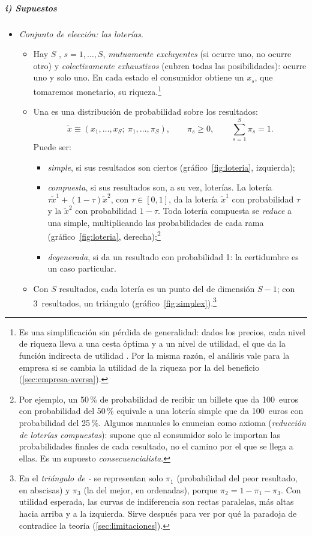 \documentclass[11pt]{article}
\begin{document}
\subparagraph{i) Supuestos}

\begin{itemize}
\item \emph{Conjunto de elección: las loterías}.
  \begin{itemize}
  \item Hay $S$ , $s=1,\dots,S$, \emph{mutuamente excluyentes} (si ocurre uno, no ocurre otro) y \emph{colectivamente exhaustivos} (cubren todas las posibilidades): ocurre uno y solo uno. En cada estado el consumidor obtiene un  $x_s$, que tomaremos monetario, su riqueza.\footnote{Es una simplificación sin pérdida de generalidad: dados los precios, cada nivel de riqueza lleva a una cesta óptima y a un nivel de utilidad, el que da la función indirecta de utilidad . Por la misma razón, el análisis vale para la empresa si se cambia la utilidad de la riqueza por la del beneficio (\ref{sec:empresa-aversa}).}
  \item Una  es una distribución de probabilidad sobre los resultados:
    $$\tilde{x}\equiv(x_1,\dots,x_S;\ \pi_1,\dots,\pi_S),\qquad \pi_s\geq 0,\qquad \sum_{s=1}^{S}\pi_s=1 .$$
    Puede ser:
    \begin{itemize}
    \item \emph{simple}, si sus resultados son ciertos (gráfico~\ref{fig:loteria}, izquierda);
    \item \emph{compuesta}, si sus resultados son, a su vez, loterías. La lotería $\tau\tilde{x}^1+(1-\tau)\tilde{x}^2$, con $\tau\in[0,1]$, da la lotería $\tilde{x}^1$ con probabilidad $\tau$ y la $\tilde{x}^2$ con probabilidad $1-\tau$. Toda lotería compuesta se \emph{reduce} a una simple, multiplicando las probabilidades de cada rama (gráfico~\ref{fig:loteria}, derecha);\footnote{Por ejemplo, un 50\,\% de probabilidad de recibir un billete que da 100~euros con probabilidad del 50\,\% equivale a una lotería simple que da 100~euros con probabilidad del 25\,\%. Algunos manuales lo enuncian como axioma (\emph{reducción de loterías compuestas}): supone que al consumidor solo le importan las probabilidades finales de cada resultado, no el camino por el que se llega a ellas. Es un supuesto \emph{consecuencialista}.}
    \item \emph{degenerada}, si da un resultado con probabilidad 1: la certidumbre es un caso particular.
    \end{itemize}
  \item Con $S$ resultados, cada lotería es un punto del  de dimensión $S-1$; con 3~resultados, un triángulo (gráfico~\ref{fig:simplex}).\footnote{En el \emph{triángulo de -} se representan solo $\pi_1$ (probabilidad del peor resultado, en abscisas) y $\pi_3$ (la del mejor, en ordenadas), porque $\pi_2=1-\pi_1-\pi_3$. Con utilidad esperada, las curvas de indiferencia son rectas paralelas, más altas hacia arriba y a la izquierda\nocite{Machina1987Choice,Machina2018Expected}. Sirve después para ver por qué la paradoja de  contradice la teoría (\ref{sec:limitaciones}).}

\end{itemize}
\end{itemize}
\end{document}
